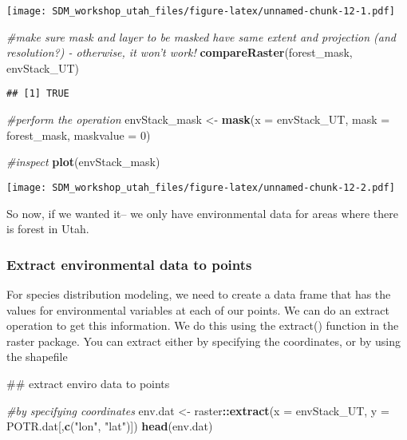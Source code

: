\documentclass[]{article}
\newenvironment{Shaded}{\begin{snugshade}}{\end{snugshade}}
\newcommand{\KeywordTok}[1]{\textcolor[rgb]{0.13,0.29,0.53}{\textbf{#1}}}
\newcommand{\DataTypeTok}[1]{\textcolor[rgb]{0.13,0.29,0.53}{#1}}
\newcommand{\DecValTok}[1]{\textcolor[rgb]{0.00,0.00,0.81}{#1}}
\newcommand{\StringTok}[1]{\textcolor[rgb]{0.31,0.60,0.02}{#1}}
\newcommand{\CommentTok}[1]{\textcolor[rgb]{0.56,0.35,0.01}{\textit{#1}}}
\newcommand{\OperatorTok}[1]{\textcolor[rgb]{0.81,0.36,0.00}{\textbf{#1}}}
\newcommand{\NormalTok}[1]{#1}
\begin{document}
\texttt{[image: SDM\_workshop\_utah\_files/figure-latex/unnamed-chunk-12-1.pdf]}

\begin{Shaded}
\begin{Highlighting}[]
\CommentTok{#make sure mask and layer to be masked have same extent and projection (and resolution?) - otherwise, it won't work!}
\KeywordTok{compareRaster}\NormalTok{(forest_mask, envStack_UT)}
\end{Highlighting}
\end{Shaded}

\begin{verbatim}
## [1] TRUE
\end{verbatim}

\begin{Shaded}
\begin{Highlighting}[]
\CommentTok{#perform the operation}
\NormalTok{envStack_mask <-}\StringTok{ }\KeywordTok{mask}\NormalTok{(}\DataTypeTok{x =}\NormalTok{ envStack_UT, }\DataTypeTok{mask =}\NormalTok{ forest_mask, }\DataTypeTok{maskvalue =} \DecValTok{0}\NormalTok{)}

\CommentTok{#inspect}
\KeywordTok{plot}\NormalTok{(envStack_mask)}
\end{Highlighting}
\end{Shaded}

\texttt{[image: SDM\_workshop\_utah\_files/figure-latex/unnamed-chunk-12-2.pdf]}

So now, if we wanted it-- we only have environmental data for areas
where there is forest in Utah.

\subsubsection{Extract environmental data to
points}\label{extract-environmental-data-to-points}

For species distribution modeling, we need to create a data frame that
has the values for environmental variables at each of our points. We can
do an extract operation to get this information. We do this using the
extract() function in the raster package. You can extract either by
specifying the coordinates, or by using the shapefile

\begin{Shaded}
\begin{Highlighting}[]
\NormalTok{## extract enviro data to points }

\CommentTok{#by specifying coordinates}
\NormalTok{env.dat <-}\StringTok{ }\NormalTok{raster}\OperatorTok{::}\KeywordTok{extract}\NormalTok{(}\DataTypeTok{x =}\NormalTok{ envStack_UT, }\DataTypeTok{y =}\NormalTok{ POTR.dat[,}\KeywordTok{c}\NormalTok{(}\StringTok{"lon"}\NormalTok{, }\StringTok{"lat"}\NormalTok{)])}
\KeywordTok{head}\NormalTok{(env.dat)}
\end{Highlighting}
\end{Shaded}
\end{document}

